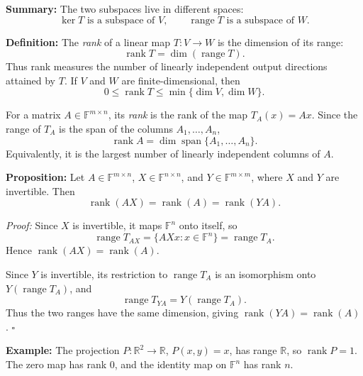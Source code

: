 \documentclass[a4paper,11pt,abstract=true]{scrartcl}
\theoremstyle{dotlessP}
\theoremstyle{dotlessS}
\theoremstyle{remark}
\theoremstyle{definition}
\begin{document}
\begin{claim_box}
\textbf{Summary:} The two subspaces live in different spaces:
\[
\ker T\text{ is a subspace of }V,
\qquad
\operatorname{range}T\text{ is a subspace of }W.
\]
\end{claim_box}

\begin{definition_box}
\textbf{Definition:} The \emph{rank} of a linear map
$T:V\longrightarrow W$ is the dimension of its range:
\[
\operatorname{rank}T=\dim(\operatorname{range}T).
\]
Thus rank measures the number of linearly independent output directions
attained by $T$. If $V$ and $W$ are finite-dimensional, then
\[
0\leq\operatorname{rank}T\leq\min\{\dim V,\dim W\}.
\]

For a matrix $A\in\mathbb{F}^{m\times n}$, its \emph{rank} is the rank
of the map $T_A(x)=Ax$. Since the range of $T_A$ is the span of the
columns $A_1,\ldots,A_n$,
\[
\operatorname{rank}A
=\dim\operatorname{span}\{A_1,\ldots,A_n\}.
\]
Equivalently, it is the largest number of linearly independent columns
of $A$.
\end{definition_box}

\begin{problem_box}
\textbf{Proposition:} Let $A\in\mathbb{F}^{m\times n}$,
$X\in\mathbb{F}^{n\times n}$, and $Y\in\mathbb{F}^{m\times m}$,
where $X$ and $Y$ are invertible. Then
\[
\operatorname{rank}(AX)=\operatorname{rank}(A)
=\operatorname{rank}(YA).
\]
\end{problem_box}

\begin{claim_box}
\textit{Proof:} Since $X$ is invertible, it maps $\mathbb{F}^n$
onto itself, so
\[
\operatorname{range}T_{AX}
=\{AXx:x\in\mathbb{F}^n\}
=\operatorname{range}T_A.
\]
Hence $\operatorname{rank}(AX)=\operatorname{rank}(A)$.

Since $Y$ is invertible, its restriction to $\operatorname{range}T_A$
is an isomorphism onto $Y(\operatorname{range}T_A)$, and
\[
\operatorname{range}T_{YA}=Y(\operatorname{range}T_A).
\]
Thus the two ranges have the same dimension, giving
$\operatorname{rank}(YA)=\operatorname{rank}(A)$.
\hfill$\square$
\end{claim_box}

\begin{example_box}
\textbf{Example:} The projection
$P:\mathbb{R}^2\longrightarrow\mathbb{R}$, $P(x,y)=x$, has range
$\mathbb{R}$, so $\operatorname{rank}P=1$. The zero map has rank $0$,
and the identity map on $\mathbb{F}^n$ has rank $n$.
\end{example_box}
\end{document}
